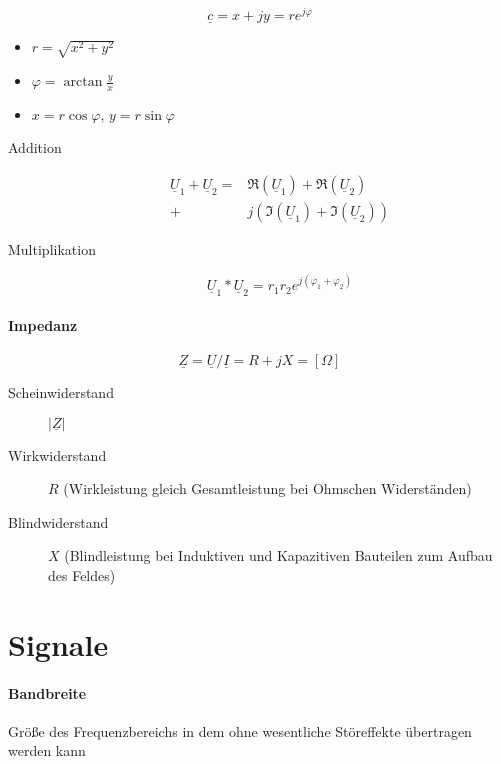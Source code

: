 $$\underline{c} = x + jy = re^{j \varphi}$$

\begin{itemize}
  \item $r = \sqrt{x^2 + y^2}$
  \item $\varphi = \arctan \frac{y}{x}$
  \item $x = r \cos \varphi$, $y = r \sin \varphi$
\end{itemize}

\begin{description}
  \item[Addition]
    \begin{align*}
      \underline{U}_1 + \underline{U}_2 = & \Re(\underline{U}_1) + \Re(\underline{U}_2)    \\
      +                                   & j(\Im(\underline{U}_1) + \Im(\underline{U}_2))
    \end{align*}
  \item[Multiplikation]
    $$\underline{U}_1 * \underline{U}_2 = r_1 r_2 e^{j(\varphi_1 + \varphi_2)}$$
\end{description}

\paragraph{Impedanz}

$$\underline{Z} = \underline{U} / \underline{I} = R + jX = [\Omega]$$

\begin{description}
  \item[Scheinwiderstand] $|\underline{Z}|$
  \item[Wirkwiderstand] $R$ (Wirkleistung gleich Gesamtleistung bei Ohmschen Widerständen)
  \item[Blindwiderstand] $X$ (Blindleistung bei Induktiven und Kapazitiven Bauteilen zum Aufbau des Feldes)
\end{description}

\section{Signale}

\paragraph{Bandbreite} Grö\ss e des Frequenzbereichs in dem ohne wesentliche Störeffekte übertragen werden kann

